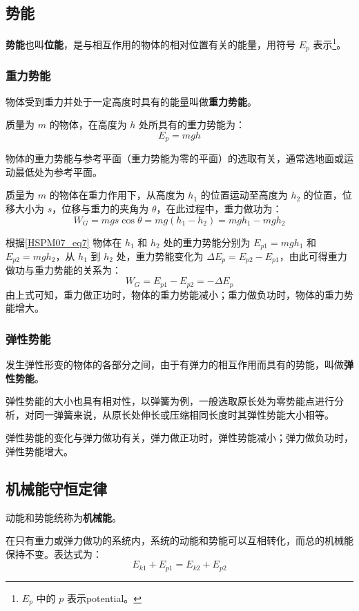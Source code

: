\subsection{势能}\label{HSPM07_sub1}

\textbf{势能}也叫\textbf{位能}，是与相互作用的物体的相对位置有关的能量，用符号 $E_p$ 表示\footnote{$E_p$ 中的 $p$ 表示potential。}。

\subsubsection{重力势能}

物体受到重力并处于一定高度时具有的能量叫做\textbf{重力势能}。

质量为 $m$ 的物体，在高度为 $h$ 处所具有的重力势能为：
\begin{equation}\label{HSPM07_eq7}
E_p=mgh
\end{equation}

物体的重力势能与参考平面（重力势能为零的平面）的选取有关，通常选地面或运动最低处为参考平面。

质量为 $m$ 的物体在重力作用下，从高度为 $h_1$ 的位置运动至高度为 $h_2$ 的位置，位移大小为 $s$，位移与重力的夹角为 $\theta$，在此过程中，重力做功为：
\begin{equation}
W_G=mgs\cos \theta=mg(h_1-h_2)=mgh_1-mgh_2
\end{equation}

根据\autoref{HSPM07_eq7} 物体在 $h_1$ 和 $h_2$ 处的重力势能分别为 $E_{p1}=mgh_1$ 和 $E_{p2}=mgh_2$，从 $h_1$ 到 $h_2$ 处，重力势能变化为 $\Delta E_p= E_{p2}-E_{p1}$，由此可得重力做功与重力势能的关系为：
\begin{equation}
W_G=E_{p1}-E_{p2}=-\Delta E_p
\end{equation}
由上式可知，重力做正功时，物体的重力势能减小；重力做负功时，物体的重力势能增大。

\subsubsection{弹性势能}

发生弹性形变的物体的各部分之间，由于有弹力的相互作用而具有的势能，叫做\textbf{弹性势能}。

弹性势能的大小也具有相对性，以弹簧为例，一般选取原长处为零势能点进行分析，对同一弹簧来说，从原长处伸长或压缩相同长度时其弹性势能大小相等。

弹性势能的变化与弹力做功有关，弹力做正功时，弹性势能减小；弹力做负功时，弹性势能增大。

\subsection{机械能守恒定律}

动能和势能统称为\textbf{机械能}。

在只有重力或弹力做功的系统内，系统的动能和势能可以互相转化，而总的机械能保持不变。表达式为：
\begin{equation}
E_{k1}+E_{p1}=E_{k2}+E_{p2}
\end{equation}

